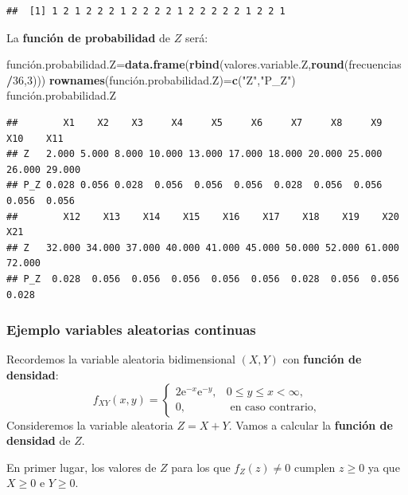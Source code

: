 \documentclass[]{book}
\newenvironment{Shaded}{\begin{snugshade}}{\end{snugshade}}
\newcommand{\DecValTok}[1]{\textcolor[rgb]{0.00,0.00,0.81}{#1}}
\newcommand{\KeywordTok}[1]{\textcolor[rgb]{0.13,0.29,0.53}{\textbf{#1}}}
\newcommand{\NormalTok}[1]{#1}
\newcommand{\OperatorTok}[1]{\textcolor[rgb]{0.81,0.36,0.00}{\textbf{#1}}}
\newcommand{\StringTok}[1]{\textcolor[rgb]{0.31,0.60,0.02}{#1}}
\begin{document}
\begin{verbatim}
##  [1] 1 2 1 2 2 2 1 2 2 2 2 1 2 2 2 2 2 1 2 2 1
\end{verbatim}

La \textbf{función de probabilidad} de \(Z\) será:

\begin{Shaded}
\begin{Highlighting}[]
\NormalTok{función.probabilidad.Z=}\KeywordTok{data.frame}\NormalTok{(}\KeywordTok{rbind}\NormalTok{(valores.variable.Z,}\KeywordTok{round}\NormalTok{(frecuencias}\OperatorTok{/}\DecValTok{36}\NormalTok{,}\DecValTok{3}\NormalTok{)))}
\KeywordTok{rownames}\NormalTok{(función.probabilidad.Z)=}\KeywordTok{c}\NormalTok{(}\StringTok{"Z"}\NormalTok{,}\StringTok{"P_Z"}\NormalTok{)}
\NormalTok{función.probabilidad.Z}
\end{Highlighting}
\end{Shaded}

\begin{verbatim}
##        X1    X2    X3     X4     X5     X6     X7     X8     X9    X10    X11
## Z   2.000 5.000 8.000 10.000 13.000 17.000 18.000 20.000 25.000 26.000 29.000
## P_Z 0.028 0.056 0.028  0.056  0.056  0.056  0.028  0.056  0.056  0.056  0.056
##        X12    X13    X14    X15    X16    X17    X18    X19    X20    X21
## Z   32.000 34.000 37.000 40.000 41.000 45.000 50.000 52.000 61.000 72.000
## P_Z  0.028  0.056  0.056  0.056  0.056  0.056  0.028  0.056  0.056  0.028
\end{verbatim}

\hypertarget{ejemplo-variables-aleatorias-continuas}{%
\subsubsection{Ejemplo variables aleatorias continuas}\label{ejemplo-variables-aleatorias-continuas}}

Recordemos la variable aleatoria bidimensional \((X,Y)\) con \textbf{función de densidad}:
\[
f_{XY}(x,y)=\begin{cases}
2 \mathrm{e}^{-x}\mathrm{e}^{-y}, & 0\leq y\leq x < \infty,\\
0, & \mbox{ en caso contrario,}
\end{cases}
\]
Consideremos la variable aleatoria \(Z=X+Y\). Vamos a calcular la \textbf{función de densidad} de \(Z\).

En primer lugar, los valores de \(Z\) para los que \(f_Z(z)\neq 0\) cumplen \(z\geq 0\) ya que \(X\geq 0\) e \(Y\geq 0\).
\end{document}
